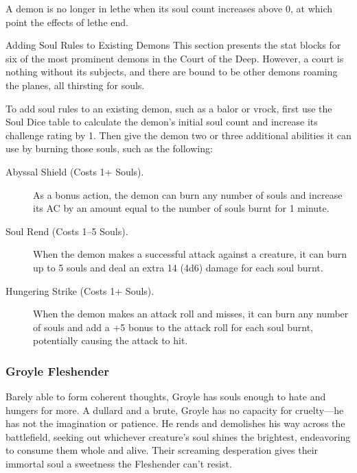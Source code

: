 \documentclass[10pt,a4paper,twoside,bg=print,twocolumn,openany,nodeprecatedcode]{dndbook}
\begin{document}
A demon is no longer in lethe when its soul count increases above 0, at which point the effects of lethe end.

\begin{DndSidebar}[float=!b]{Adding Soul Rules to Existing Demons}
This section presents the stat blocks for six of the most prominent demons in the Court of the Deep. However, a court is nothing without its subjects, and there are bound to be other demons roaming the planes, all thirsting for souls.



To add soul rules to an existing demon, such as a balor or vrock, first use the Soul Dice table to calculate the demon's initial soul count and increase its challenge rating by 1. Then give the demon two or three additional abilities it can use by burning those souls, such as the following:




\begin{description}
\item[Abyssal Shield (Costs 1+ Souls).]
As a bonus action, the demon can burn any number of souls and increase its AC by an amount equal to the number of souls burnt for 1 minute.

\item[Soul Rend (Costs 1–5 Souls).]
When the demon makes a successful attack against a creature, it can burn up to 5 souls and deal an extra 14 (4d6) damage for each soul burnt.

\item[Hungering Strike (Costs 1+ Souls).]
When the demon makes an attack roll and misses, it can burn any number of souls and add a +5 bonus to the attack roll for each soul burnt, potentially causing the attack to hit.

\end{description}



\end{DndSidebar}

\subsubsection{Groyle Fleshender}
Barely able to form coherent thoughts, Groyle has souls enough to hate and hungers for more. A dullard and a brute, Groyle has no capacity for cruelty—he has not the imagination or patience. He rends and demolishes his way across the battlefield, seeking out whichever creature's soul shines the brightest, endeavoring to consume them whole and alive. Their screaming desperation gives their immortal soul a sweetness the Fleshender can't resist.
\end{document}
